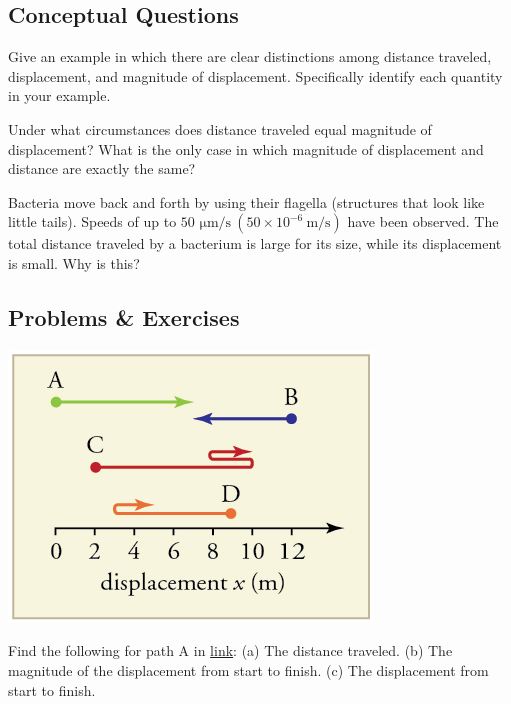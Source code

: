 \documentclass[
]{book}
\begin{document}
\hypertarget{fs-id2075470}{}
\hypertarget{conceptual-questions}{%
\subsection{Conceptual Questions}\label{conceptual-questions}}

\hypertarget{fs-id1704056}{}
\leavevmode{}%
Give an example in which there are clear distinctions among distance
traveled, displacement, and magnitude of displacement. Specifically
identify each quantity in your example.

\hypertarget{fs-id3147584}{}
\leavevmode{}%
Under what circumstances does distance traveled equal magnitude of
displacement? What is the only case in which magnitude of displacement
and distance are exactly the same?

\hypertarget{fs-id3563423}{}
\leavevmode{}%
Bacteria move back and forth by using their flagella (structures that
look like little tails). Speeds of up to
\({\text{50\ μm/s}\ \left( {{\text{50} \times \text{10}^{- 6}}\ \text{m/s}} \right)}{}\)
have been observed. The total distance traveled by a bacterium is large
for its size, while its displacement is small. Why is this?

\hypertarget{fs-id3417389}{}
\hypertarget{problems-exercises}{%
\subsection{Problems \& Exercises}\label{problems-exercises}}

\includegraphics{images/Figure_02_01Sol_01.jpg}

\hypertarget{fs-id1126076}{}
\leavevmode{}%
Find the following for path A in
\protect\hyperlink{import-auto-id2076702}{link}: (a) The distance
traveled. (b) The magnitude of the displacement from start to finish.
(c) The displacement from start to finish.
\end{document}
